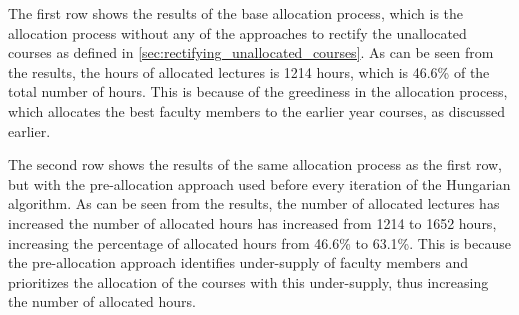 \begin{table}[H]
  \centering
  \caption{Experimental Results}
  \label{tab:overall_experimental_results}
\end{table}

The first row shows the results of the base allocation process, which is the allocation process without any of the approaches to rectify the unallocated courses as defined in  \autoref{sec:rectifying_unallocated_courses}. As can be seen from the results, the hours of allocated lectures is 1214 hours, which is 46.6\% of the total number of hours. This is because of the greediness in the allocation process, which allocates the best faculty members to the earlier year courses, as discussed earlier.

The second row shows the results of the same allocation process as the first row, but with the pre-allocation approach used before every iteration of the Hungarian algorithm. As can be seen from the results, the number of allocated lectures has increased the number of allocated hours has increased from 1214 to 1652 hours, increasing the percentage of allocated hours from 46.6\% to 63.1\%. This is because the pre-allocation approach identifies under-supply of faculty members and prioritizes the allocation of the courses with this under-supply, thus increasing the number of allocated hours.

